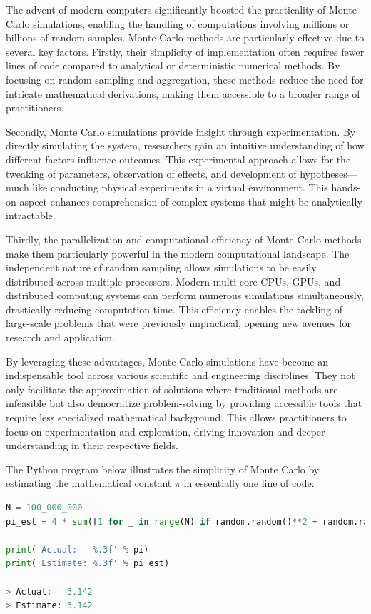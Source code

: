 \documentclass[final,5p,times,twocolumn,authoryear]{elsarticle}
\begin{document}
The advent of modern computers significantly boosted the practicality of Monte Carlo simulations, enabling the handling of computations involving millions or billions of random samples. Monte Carlo methods are particularly effective due to several key factors. Firstly, their simplicity of implementation often requires fewer lines of code compared to analytical or deterministic numerical methods. By focusing on random sampling and aggregation, these methods reduce the need for intricate mathematical derivations, making them accessible to a broader range of practitioners.

Secondly, Monte Carlo simulations provide insight through experimentation. By directly simulating the system, researchers gain an intuitive understanding of how different factors influence outcomes. This experimental approach allows for the tweaking of parameters, observation of effects, and development of hypotheses—much like conducting physical experiments in a virtual environment. This hands-on aspect enhances comprehension of complex systems that might be analytically intractable.

Thirdly, the parallelization and computational efficiency of Monte Carlo methods make them particularly powerful in the modern computational landscape. The independent nature of random sampling allows simulations to be easily distributed across multiple processors. Modern multi-core CPUs, GPUs, and distributed computing systems can perform numerous simulations simultaneously, drastically reducing computation time. This efficiency enables the tackling of large-scale problems that were previously impractical, opening new avenues for research and application.

By leveraging these advantages, Monte Carlo simulations have become an indispensable tool across various scientific and engineering disciplines. They not only facilitate the approximation of solutions where traditional methods are infeasible but also democratize problem-solving by providing accessible tools that require less specialized mathematical background. This allows practitioners to focus on experimentation and exploration, driving innovation and deeper understanding in their respective fields.

The Python program below illustrates the simplicity of Monte Carlo by estimating the mathematical constant $\pi$ in essentially one line of code:

\begin{minipage}{\linewidth}
\begin{lstlisting}[language=Python, caption=Python code to estimate $\pi$. See the article \href{https://bytepawn.com/estimating-famous-mathematical-constants-with-monte-carlo-simulations.html}{Estimating mathematical constants with Monte Carlo simulations} for more examples and code samples.]
N = 100_000_000
pi_est = 4 * sum([1 for _ in range(N) if random.random()**2 + random.random()**2 < 1]) / N

print('Actual:   %.3f' % pi)
print('Estimate: %.3f' % pi_est)

> Actual:   3.142
> Estimate: 3.142
\end{lstlisting}
\end{minipage}
\end{document}
